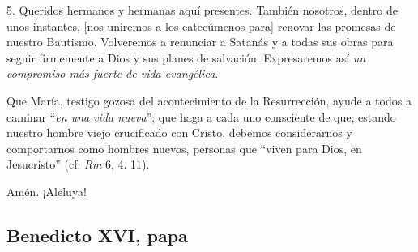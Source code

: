 			\begin{body}\begin{bodysmall}\end{bodysmall}\end{body}
			
			\begin{body}5. Queridos hermanos y hermanas aquí presentes. También nosotros, dentro de unos instantes, [nos uniremos a los catecúmenos para] renovar las promesas de nuestro Bautismo. Volveremos a renunciar a Satanás y a todas sus obras para seguir firmemente a Dios y sus planes de salvación. Expresaremos así \textit{un compromiso más fuerte de vida evangélica}.\end{body}
			
			\begin{body}Que María, testigo gozosa del acontecimiento de la Resurrección, ayude a todos a caminar “\textit{en una vida nueva}”; que haga a cada uno consciente de que, estando nuestro hombre viejo crucificado con Cristo, debemos considerarnos y comportarnos como hombres nuevos, personas que “viven para Dios, en Jesucristo” (cf. \textit{Rm} 6, 4. 11).\end{body}
			
			\begin{body}Amén. ¡Aleluya!\end{body}
			
			\subsection{Benedicto XVI, papa}
			
